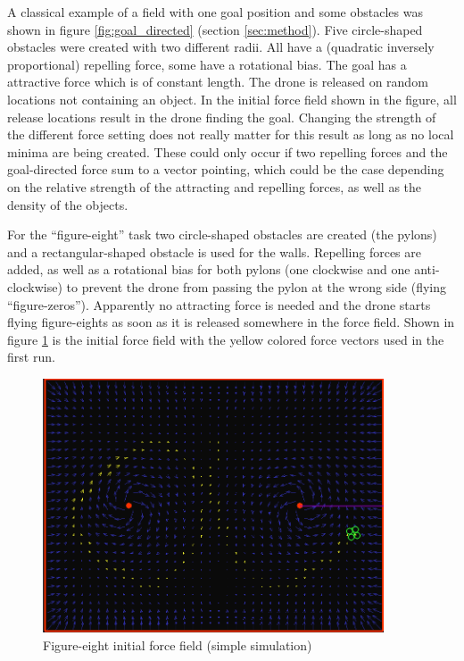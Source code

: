 \documentclass[11pt]{article}
\begin{document}
A classical example of a field with one goal position and some obstacles was shown in figure \ref{fig:goal_directed} (section \ref{sec:method}). Five circle-shaped obstacles were created with two different radii. All have a (quadratic inversely proportional) repelling force, some have a rotational bias. The goal has a attractive force which is of constant length. The drone is released on random locations not containing an object. In the initial force field shown in the figure, all release locations result in the drone finding the goal. Changing the strength of the different force setting does not really matter for this result as long as no local minima are being created. These could only occur if two repelling forces and the goal-directed force sum to a vector pointing, which could be the case depending on the relative strength of the attracting and repelling forces, as well as the density of the objects.

For the ``figure-eight'' task two circle-shaped obstacles are created (the pylons) and a rectangular-shaped obstacle is used for the walls. Repelling forces are added, as well as a rotational bias for both pylons (one clockwise and one anti-clockwise) to prevent the drone from passing the pylon at the wrong side (flying ``figure-zeros''). Apparently no attracting force is needed and the drone starts flying figure-eights as soon as it is released somewhere in the force field. Shown in figure \ref{fig:simple_init} is the initial force field with the yellow colored force vectors used in the first run.

  \begin{figure}
    \begin{center}
    \includegraphics[width=0.9\textwidth]{img/sim_init}
    \caption{Figure-eight initial force field (simple simulation)}
    \label{fig:simple_init}
    \end{center}
  \end{figure}
\end{document}
